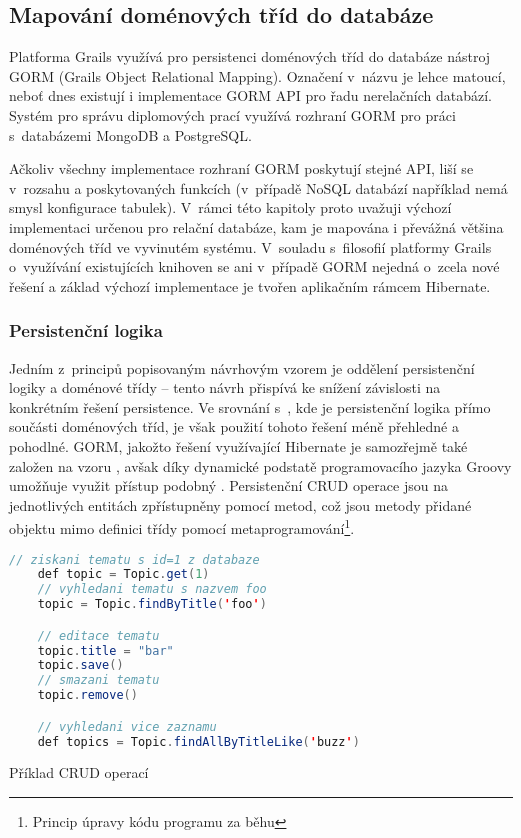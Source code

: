 \subsection{Mapování doménových tříd do databáze}
Platforma Grails využívá pro persistenci doménových tříd do databáze nástroj GORM (Grails Object Relational Mapping). Označení  v~názvu je lehce matoucí, neboť dnes existují i implementace GORM API pro řadu nerelačních databází. Systém pro správu diplomových prací využívá rozhraní GORM pro práci s~databázemi MongoDB a PostgreSQL.


Ačkoliv všechny implementace rozhraní GORM poskytují stejné API, liší se v~rozsahu a poskytovaných funkcích (v~případě NoSQL databází například nemá smysl konfigurace tabulek). V~rámci této kapitoly proto uvažuji výchozí implementaci určenou pro relační databáze, kam je mapována i převážná většina doménových tříd ve vyvinutém systému. V~souladu s~filosofií platformy Grails o~využívání existujících knihoven se ani v~případě GORM nejedná o~zcela nové řešení a základ výchozí implementace je tvořen aplikačním rámcem Hibernate.

\subsubsection{\textbf{Persistenční logika}}
Jedním z~principů popisovaným návrhovým vzorem  je oddělení persistenční logiky a doménové třídy -- tento návrh přispívá ke snížení závislosti na konkrétním řešení persistence. Ve srovnání s~, kde je persistenční logika přímo součásti doménových tříd, je však použití tohoto řešení méně přehledné a pohodlné. GORM, jakožto řešení využívající Hibernate je samozřejmě také založen na vzoru , avšak díky dynamické podstatě programovacího jazyka Groovy umožňuje využit přístup podobný . Persistenční CRUD operace jsou na jednotlivých entitách zpřístupněny pomocí  metod, což jsou metody přidané objektu mimo definici třídy pomocí metaprogramování\footnote{Princip úpravy kódu programu za běhu}.

\begin{example}
\centering
\begin{lstlisting}[language=Java]
    // ziskani tematu s id=1 z databaze
    def topic = Topic.get(1)
    // vyhledani tematu s nazvem foo
    topic = Topic.findByTitle('foo')

    // editace tematu
    topic.title = "bar"
    topic.save()
    // smazani tematu
    topic.remove()

    // vyhledani vice zaznamu
    def topics = Topic.findAllByTitleLike('buzz')
\end{lstlisting}
\caption{Příklad CRUD operací}
\end{example}


